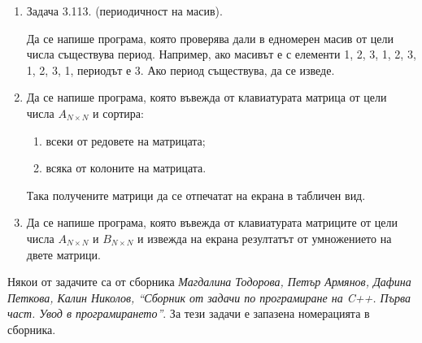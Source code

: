 \documentclass[12pt,a4paper]{article}
\begin{document}
\begin{enumerate}
	\item Задача 3.113. (периодичност на масив). 

	Да се напише програма, която проверява дали в едномерен масив от цели числа съществува период. Например, ако масивът е с елементи 1, 2, 3, 1, 2, 3, 1, 2, 3, 1, периодът е 3. Ако период съществува, да се изведе.

	\item

	Да се напише програма, която въвежда от клавиатурата матрица от цели числа $A_{N\times N}$ и сортира:

	\begin{enumerate}
		\item всеки от редовете на матрицата;
		\item всяка от колоните на матрицата.
	\end{enumerate}

	Така получените матрици да се отпечатат на екрана в табличен вид.

	\item 
	Да се напише програма, която въвежда от клавиатурата матриците от цели числа $A_{N\times N}$ и $B_{N\times N}$ и извежда на екрана резултатът от умножението на двете матрици.



\end{enumerate}


	\vspace{20px}

	\small{Някои от задачите са от сборника \textit{Магдалина Тодорова, Петър Армянов, Дафина Петкова, Калин Николов, ``Сборник от задачи по програмиране на C++. Първа част. Увод в програмирането''}. За тези задачи е запазена номерацията в сборника.}
\end{document}
